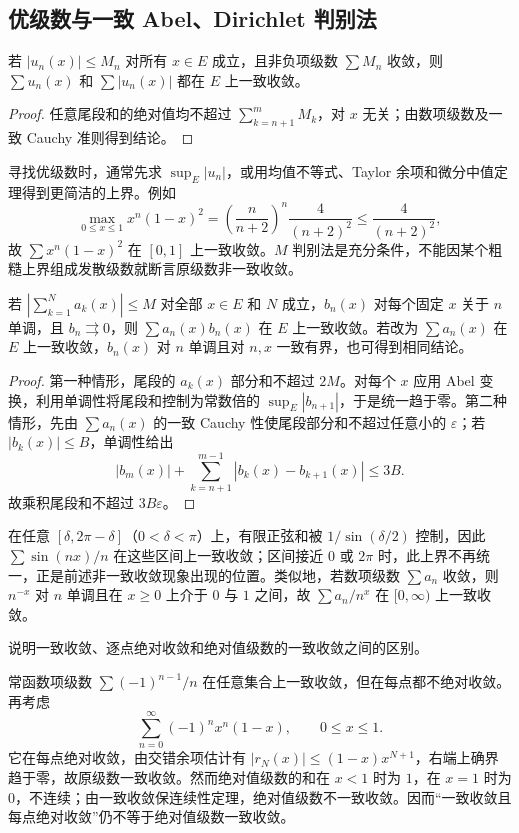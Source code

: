 \subsection{优级数与一致 Abel、Dirichlet 判别法}

\begin{theorem}
\label{thm:pei-m-test}
若 $|u_n(x)|\leq M_n$ 对所有 $x\in E$ 成立，且非负项级数 $\sum M_n$ 收敛，则 $\sum u_n(x)$ 和 $\sum|u_n(x)|$ 都在 $E$ 上一致收敛。
\end{theorem}
\begin{proof}
任意尾段和的绝对值均不超过 $\sum_{k=n+1}^{m}M_k$，对 $x$ 无关；由数项级数及一致 Cauchy 准则得到结论。
\end{proof}

寻找优级数时，通常先求 $\sup_E|u_n|$，或用均值不等式、Taylor 余项和微分中值定理得到更简洁的上界。例如
\[
 \max_{0\leq x\leq1}x^n(1-x)^2
 =\left(\frac n{n+2}\right)^n\frac4{(n+2)^2}
 \leq\frac4{(n+2)^2},
\]
故 $\sum x^n(1-x)^2$ 在 $[0,1]$ 上一致收敛。$M$ 判别法是充分条件，不能因某个粗糙上界组成发散级数就断言原级数非一致收敛。

\begin{theorem}
\label{thm:pei-uniform-dirichlet}
若 $|\sum_{k=1}^{N}a_k(x)|\leq M$ 对全部 $x\in E$ 和 $N$ 成立，$b_n(x)$ 对每个固定 $x$ 关于 $n$ 单调，且 $b_n\rightrightarrows0$，则 $\sum a_n(x)b_n(x)$ 在 $E$ 上一致收敛。若改为 $\sum a_n(x)$ 在 $E$ 上一致收敛，$b_n(x)$ 对 $n$ 单调且对 $n,x$ 一致有界，也可得到相同结论。
\end{theorem}
\begin{proof}
第一种情形，尾段的 $a_k(x)$ 部分和不超过 $2M$。对每个 $x$ 应用 Abel 变换，利用单调性将尾段和控制为常数倍的 $\sup_E|b_{n+1}|$，于是统一趋于零。第二种情形，先由 $\sum a_n(x)$ 的一致 Cauchy 性使尾段部分和不超过任意小的 $\varepsilon$；若 $|b_k(x)|\leq B$，单调性给出
\[
 |b_m(x)|+\sum_{k=n+1}^{m-1}|b_k(x)-b_{k+1}(x)|\leq3B.
\]
故乘积尾段和不超过 $3B\varepsilon$。
\end{proof}

在任意 $[\delta,2\pi-\delta]$（$0<\delta<\pi$）上，有限正弦和被 $1/\sin(\delta/2)$ 控制，因此 $\sum\sin(nx)/n$ 在这些区间上一致收敛；区间接近 $0$ 或 $2\pi$ 时，此上界不再统一，正是前述非一致收敛现象出现的位置。类似地，若数项级数 $\sum a_n$ 收敛，则 $n^{-x}$ 对 $n$ 单调且在 $x\geq0$ 上介于 $0$ 与 $1$ 之间，故 $\sum a_n/n^x$ 在 $[0,\infty)$ 上一致收敛。

\begin{example}
说明一致收敛、逐点绝对收敛和绝对值级数的一致收敛之间的区别。
\end{example}
\begin{solve}
常函数项级数 $\sum(-1)^{n-1}/n$ 在任意集合上一致收敛，但在每点都不绝对收敛。再考虑
\[
 \sum_{n=0}^{\infty}(-1)^nx^n(1-x),\qquad 0\leq x\leq1.
\]
它在每点绝对收敛，由交错余项估计有 $|r_N(x)|\leq(1-x)x^{N+1}$，右端上确界趋于零，故原级数一致收敛。然而绝对值级数的和在 $x<1$ 时为 $1$，在 $x=1$ 时为 $0$，不连续；由一致收敛保连续性定理，绝对值级数不一致收敛。因而“一致收敛且每点绝对收敛”仍不等于绝对值级数一致收敛。
\end{solve}

